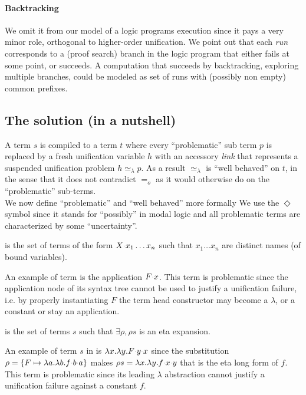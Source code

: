 \documentclass[sigconf,natbib=false,review]{acmart}
\newcommand{\appsep}{\ensuremath{\textcolor{lightgray}{\cdot}}}
\newcommand{\EqualRel}{\ensuremath{=}}
\newcommand{\UnifRel}{\ensuremath{\simeq}}
\newcommand{\Eo}{\ensuremath{\EqualRel_o}\xspace}
\newcommand{\Ue}{\ensuremath{\UnifRel_\lambda}\xspace}
\begin{document}
\paragraph{Backtracking} We omit it from our model of a logic programs execution
since it pays a very minor role, orthogonal to higher-order unification.
We point out that each \emph{run} corresponds to a (proof search) branch in the
logic program that either fails at some point, or succeeds. A computation that
succeeds by backtracking, exploring multiple branches, could be
modeled as set of runs with (possibly non empty) common prefixes.

\subsection{The solution (in a nutshell)}
\label{sec:nutshell}
A term $s$ is compiled to a term $t$ where every
``problematic'' sub term $p$ is replaced by a fresh unification variable $h$
with an accessory \emph{link} that represents a suspended unification problem
$h \Ue p$. As a result \Ue is ``well behaved'' on $t$, in the sense that
it does not contradict \Eo as it would otherwise do on the
``problematic'' sub-terms.\\
We now define ``problematic'' and ``well behaved'' more formally
We use the $\Diamond$ symbol since it stands for ``possibly'' in modal logic
and all problematic terms are characterized by some ``uncertainty''.

\begin{definition}[\maybebeta]\label{def:maybebeta}
  \maybebeta is the set of terms of the form $X \appsep x_1 \ldots x_n$
  such that $x_1 \ldots x_n$ are distinct names (of bound variables).
\end{definition}

\noindent
An example of term \maybebeta{} is the application $F \appsep x$.
This term is problematic since the application node of
its syntax tree cannot be used to justify a
unification failure, i.e. by properly instantiating $F$ the term
head constructor may become a $\lambda$, or a constant or stay an application.

\begin{definition}[\maybeeta]\label{def:maybeeta}
  \maybeeta is the set of terms $s$ such that $\exists \rho, \rho s$
  is an eta expansion.
\end{definition}

\noindent
An example of term $s$ in \maybeeta{} is
$\lambda x.\lambda y.F \appsep y \appsep x$
since the substitution
$\rho = \{ F \mapsto \lambda a.\lambda b.f \appsep b \appsep a\}$
makes $\rho s = \lambda x.\lambda y.f \appsep x \appsep y$
that is the eta long form of $f$. This term is problematic since
its leading $\lambda$ abstraction cannot justify a
unification failure against a constant $f$.
\end{document}
